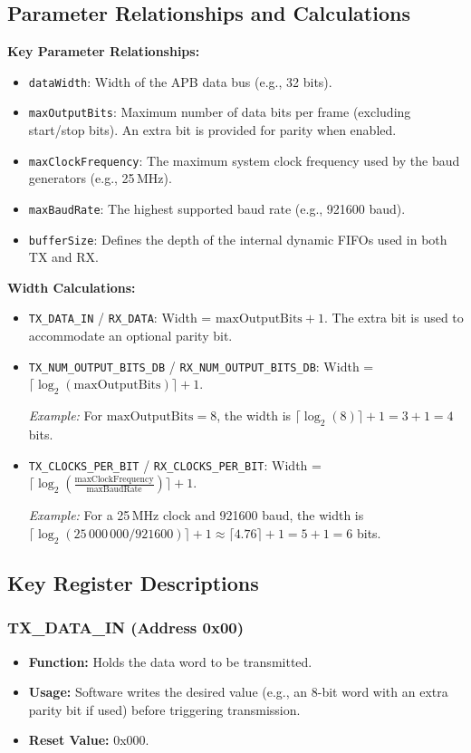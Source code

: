 \subsection{Parameter Relationships and Calculations}

\textbf{Key Parameter Relationships:}
\begin{itemize}
    \item \texttt{dataWidth}: Width of the APB data bus (e.g., 32 bits).
    \item \texttt{maxOutputBits}: Maximum number of data bits per frame (excluding start/stop bits). An extra bit is provided for parity when enabled.
    \item \texttt{maxClockFrequency}: The maximum system clock frequency used by the baud generators (e.g., 25\,MHz).
    \item \texttt{maxBaudRate}: The highest supported baud rate (e.g., 921600 baud).
    \item \texttt{bufferSize}: Defines the depth of the internal dynamic FIFOs used in both TX and RX.
\end{itemize}

\textbf{Width Calculations:}
\begin{itemize}
    \item \texttt{TX\_DATA\_IN} / \texttt{RX\_DATA}: Width = \(\text{maxOutputBits}+1\). The extra bit is used to accommodate an optional parity bit.
    \item \texttt{TX\_NUM\_OUTPUT\_BITS\_DB} / \texttt{RX\_NUM\_OUTPUT\_BITS\_DB}: Width = \(\lceil\log_2(\text{maxOutputBits})\rceil+1\).

    \textit{Example:} For \(\text{maxOutputBits}=8\), the width is \(\lceil\log_2(8)\rceil+1 = 3+1 = 4\) bits.

    \item \texttt{TX\_CLOCKS\_PER\_BIT} / \texttt{RX\_CLOCKS\_PER\_BIT}: Width = \(\lceil\log_2(\tfrac{\text{maxClockFrequency}}{\text{maxBaudRate}})\rceil+1\).

    \textit{Example:} For a 25\,MHz clock and 921600 baud, the width is \(\lceil\log_2(25\,000\,000/921600)\rceil+1 \approx \lceil4.76\rceil+1 = 5+1 = 6\) bits.
\end{itemize}

\subsection{Key Register Descriptions}

\subsubsection{TX\_DATA\_IN (Address 0x00)}
\begin{itemize}[noitemsep]
    \item \textbf{Function:} Holds the data word to be transmitted.
    \item \textbf{Usage:} Software writes the desired value (e.g., an 8-bit word with an extra parity bit if used) before triggering transmission.
    \item \textbf{Reset Value:} 0x000.
\end{itemize}

